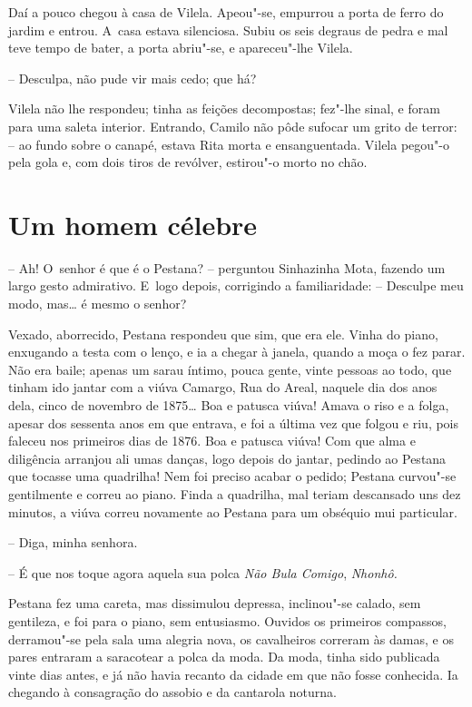 Daí a pouco chegou à casa de Vilela. Apeou"-se, empurrou a porta de ferro
do jardim e entrou. A~casa estava silenciosa. Subiu os seis degraus de
pedra e mal teve tempo de bater, a porta abriu"-se, e apareceu"-lhe
Vilela.

-- Desculpa, não pude vir mais cedo; que há?

Vilela não lhe respondeu; tinha as feições decompostas; fez"-lhe sinal, e
foram para uma saleta interior. Entrando, Camilo não pôde sufocar um
grito de terror: -- ao fundo sobre o canapé, estava Rita morta e
ensanguentada. Vilela pegou"-o pela gola e, com dois tiros de revólver,
estirou"-o morto no chão.

\chapter{Um homem célebre}

-- Ah! O~senhor é que é o Pestana? -- perguntou Sinhazinha Mota, fazendo
um largo gesto admirativo. E~logo depois, corrigindo a familiaridade: --
Desculpe meu modo, mas\ldots{} é mesmo o senhor?

Vexado, aborrecido, Pestana respondeu que sim, que era ele. Vinha do
piano, enxugando a testa com o lenço, e ia a chegar à janela, quando a
moça o fez parar. Não era baile; apenas um sarau íntimo, pouca gente,
vinte pessoas ao todo, que tinham ido jantar com a viúva Camargo, Rua do
Areal, naquele dia dos anos dela, cinco de novembro de 1875\ldots{} Boa e
patusca viúva! Amava o riso e a folga, apesar dos sessenta anos em que
entrava, e foi a última vez que folgou e riu, pois faleceu nos primeiros
dias de 1876. Boa e patusca viúva! Com que alma e diligência arranjou
ali umas danças, logo depois do jantar, pedindo ao Pestana que tocasse
uma quadrilha! Nem foi preciso acabar o pedido; Pestana curvou"-se
gentilmente e correu ao piano. Finda a quadrilha, mal teriam descansado
uns dez minutos, a viúva correu novamente ao Pestana para um obséquio
mui particular.

-- Diga, minha senhora.

-- É que nos toque agora aquela sua polca \emph{Não Bula Comigo},
\emph{Nhonhô.}

Pestana fez uma careta, mas dissimulou depressa, inclinou"-se calado, sem
gentileza, e foi para o piano, sem entusiasmo. Ouvidos os primeiros
compassos, derramou"-se pela sala uma alegria nova, os cavalheiros
correram às damas, e os pares entraram a saracotear a polca da moda. Da
moda, tinha sido publicada vinte dias antes, e já não havia recanto da
cidade em que não fosse conhecida. Ia chegando à consagração do assobio
e da cantarola noturna.

